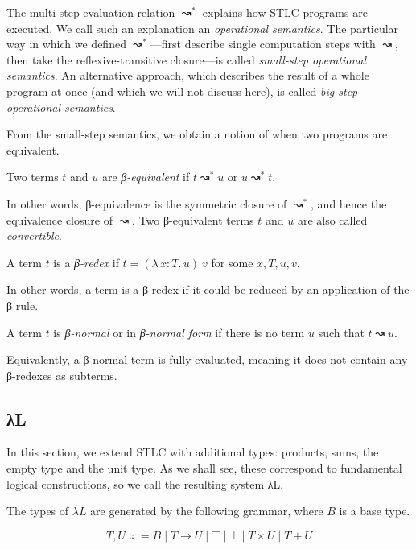 \documentclass{scrartcl}
\theoremstyle{definition}
\newcommand{\Lam}[2]{λ\,#1.\, #2}
\begin{document}
The multi-step evaluation relation $↝^{*}$ explains how STLC programs are executed.
We call such an explanation an \emph{operational semantics}.
The particular way in which we defined $↝^{*}$---first describe single computation steps with $↝$, then take the reflexive-transitive closure---is called \emph{small-step operational semantics}.
An alternative approach, which describes the result of a whole program at once (and which we will not discuss here), is called \emph{big-step operational semantics}.

From the small-step semantics, we obtain a notion of when two programs are equivalent.

\begin{definition}[β-equivalence]
  Two terms $t$ and $u$ are \emph{β-equivalent} if $t ↝^{*} u$ or $u ↝^{*} t$.
\end{definition}

In other words, β-equivalence is the symmetric closure of $↝^{*}$, and hence the equivalence closure of $↝$.
Two β-equivalent terms $t$ and $u$ are also called \emph{convertible}.

\begin{definition}[β-redex]
  A term $t$ is a \emph{β-redex} if $t = (\Lam{x : T}{u})~v$ for some $x,T,u,v$.
\end{definition}

In other words, a term is a β-redex if it could be reduced by an application of the β rule.

\begin{definition}
  A term $t$ is \emph{β-normal} or in \emph{β-normal form} if there is no term $u$ such that $t ↝ u$.
\end{definition}

Equivalently, a β-normal term is fully evaluated, meaning it does not contain any β-redexes as subterms.

\subsection{λL}

In this section, we extend STLC with additional types: products, sums, the empty type and the unit type.
As we shall see, these correspond to fundamental logical constructions, so we call the resulting system λL.

\begin{definition}[Types]
  The types of $λL$ are generated by the following grammar, where $B$ is a base type.

  \[
    T,U ∷= B \mid T → U \mid ⊤ \mid ⊥ \mid T × U \mid T + U
  \]
\end{definition}
\end{document}
